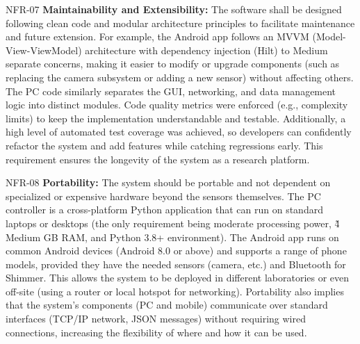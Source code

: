 \documentclass[11pt,a4paper]{report}
\begin{document}
  NFR-07 \textbf{Maintainability and Extensibility:} The software shall be designed
  following clean code and modular architecture principles to facilitate maintenance
  and future extension.  For example, the Android app follows an MVVM
  (Model-View-ViewModel) architecture with dependency injection (Hilt) to Medium
                          separate concerns, making it easier to modify or upgrade
                          components (such as replacing the camera subsystem or
                          adding a new sensor) without affecting others.  The PC code
                          similarly separates the GUI, networking, and data
                          management logic into distinct modules.  Code quality
                          metrics were
                          enforced (e.g., complexity limits) to keep the implementation understandable and
                          testable\cite{SimulatorValidityPhysiological2025}\cite{GSRGuideIMotions}.
                          Additionally, a high level of automated test coverage
                          was achieved, so developers can confidently refactor the
                          system and add features while catching regressions early.
                          This requirement ensures the longevity of the system as a
                          research platform.

  NFR-08 \textbf{Portability:} The system should be portable and not dependent on
  specialized or expensive hardware beyond the sensors themselves.  The PC controller
  is a cross-platform Python application that can run on standard laptops or desktops
  (the only requirement being moderate processing power, \~4 Medium
                          GB RAM, and Python 3.8+ environment).  The Android app runs
                          on common Android devices (Android 8.0 or above) and
                          supports a range of phone models, provided they have the
                          needed sensors (camera, etc.) and Bluetooth for Shimmer.
                          This allows the system to be deployed in different
                          laboratories or
                          even off-site (using a router or local hotspot for
                          networking).  Portability also implies that the system's
                          components (PC and mobile) communicate over standard
                          interfaces (TCP/IP network, JSON messages) without
                          requiring wired connections, increasing the flexibility of
                          where and how it can be
                          used.
\end{document}
